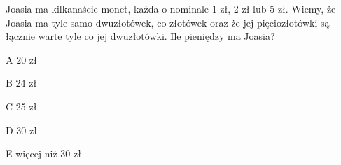 \begin{tresc}
Joasia ma kilkanaście monet, każda o nominale 1 zł, 2 zł lub 5 zł. Wiemy, że Joasia ma tyle samo dwuzłotówek, co złotówek oraz że jej pięciozłotówki są łącznie warte tyle co jej dwuzłotówki. Ile pieniędzy ma Joasia?
\end{tresc}
\begin{wariant}{A} 20 zł \end{wariant}
\begin{wariant}{B} 24 zł \end{wariant}
\begin{wariant}{C} 25 zł \end{wariant}
\begin{wariant}{D} 30 zł \end{wariant}
\begin{wariant}{E} więcej niż 30 zł \end{wariant}
